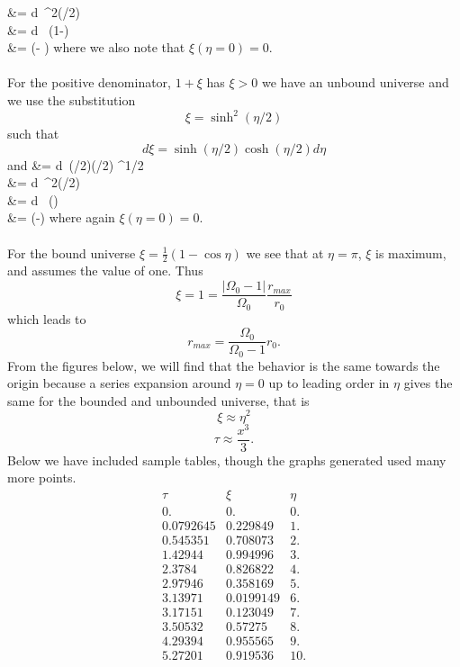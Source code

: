 \documentclass[10pt,letterpaper]{article}
\begin{document}
&= \int d\eta\ \sin^2(\eta/2)\\
&= \int d\eta\  (1-\cos\eta)\\
\tau &= (\eta - \sin\eta)
\ea
where we also note that $\xi(\eta=0) = 0$.\\ \\
For the positive denominator, $1+\xi$ has $\xi >0$ we have an unbound universe and we use the substitution
\[
	\xi = \sinh^2(\eta/2)
\]
such that
\[
	d\xi = \sinh(\eta/2)\cosh(\eta/2)d\eta
\]
and
\ba
	\tau &= \int d\eta\ \sinh(\eta/2)\cosh(\eta/2) ^{1/2}\\
&= \int d\eta\ \sinh^2(\eta/2)\\
&= \int d\eta\  (\cosh{})\\
\tau &= (\sinh\eta -\eta )
\ea
where again $\xi(\eta=0) = 0$. \\ \\
For the bound universe $\xi = \frac12 (1-\cos\eta)$ we see that at $\eta = \pi$, $\xi$ is maximum, and assumes the value of one. Thus
\[
	\xi = 1 = \frac{|\Omega_0-1|}{\Omega_0}\frac{r_{max}}{r_0}
\]
which leads to 
\[
	r_{max} = \frac{\Omega_0}{\Omega_0-1}r_0.
\]
From the figures below, we will find that the behavior is the same towards the origin because a series expansion around $\eta = 0$ up to leading order in $\eta$ gives the same for the bounded and unbounded universe, that is
\[
	\xi \approx \eta^2
\]
\[
	\tau \approx \frac{x^3}{3}.
\]
Below we have included sample tables, though the graphs generated used many more points.
	\[
	\begin{array}{ccc}
 \tau  & \xi  & \eta  \\
 0. & 0. & 0. \\
 0.0792645 & 0.229849 & 1. \\
 0.545351 & 0.708073 & 2. \\
 1.42944 & 0.994996 & 3. \\
 2.3784 & 0.826822 & 4. \\
 2.97946 & 0.358169 & 5. \\
 3.13971 & 0.0199149 & 6. \\
 3.17151 & 0.123049 & 7. \\
 3.50532 & 0.57275 & 8. \\
 4.29394 & 0.955565 & 9. \\
 5.27201 & 0.919536 & 10. \\
\end{array}
\]
\end{document}
